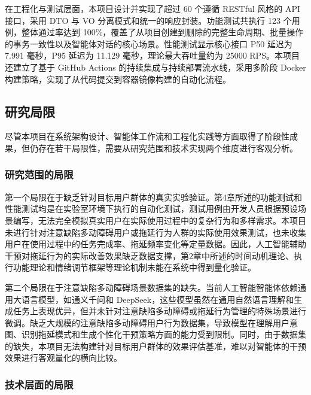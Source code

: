 \par 在工程化与测试层面，本项目设计并实现了超过 60 个遵循 RESTful 风格的 API 接口，采用 DTO 与 VO 分离模式和统一的响应封装。功能测试共执行 123 个用例，整体通过率达到 100\%，覆盖了从项目创建到删除的完整生命周期、批量操作的事务一致性以及智能体对话的核心场景。性能测试显示核心接口 P50 延迟为 7.991 毫秒，P95 延迟为 11.129 毫秒，理论最大吞吐量约为 25000 RPS。本项目还建立了基于 GitHub Actions 的持续集成与持续部署流水线，采用多阶段 Docker 构建策略，实现了从代码提交到容器镜像构建的自动化流程。

\subsection{研究局限}

\par 尽管本项目在系统架构设计、智能体工作流和工程化实践等方面取得了阶段性成果，但仍存在若干局限性，需要从研究范围和技术实现两个维度进行客观分析。

\subsubsection{研究范围的局限}

\par 第一个局限在于缺乏针对目标用户群体的真实实验验证。第4章所述的功能测试和性能测试均是在实验室环境下执行的自动化测试，测试用例由开发人员根据预设场景编写，无法完全模拟真实用户在实际使用过程中的复杂行为和多样需求。本项目未进行针对注意缺陷多动障碍用户或拖延行为人群的实际使用效果测试，也未收集用户在使用过程中的任务完成率、拖延频率变化等定量数据。因此，人工智能辅助干预对拖延行为的实际改善效果缺乏数据支撑，第2章中所述的时间动机理论、执行功能理论和情绪调节框架等理论机制未能在系统中得到量化验证。

\par 第二个局限在于注意缺陷多动障碍场景数据集的缺失。当前人工智能智能体依赖通用大语言模型，如通义千问和 DeepSeek，这些模型虽然在通用自然语言理解和生成任务上表现优异，但并未针对注意缺陷多动障碍或拖延行为管理的特殊场景进行微调。缺乏大规模的注意缺陷多动障碍用户行为数据集，导致模型在理解用户意图、识别拖延模式和生成个性化干预策略方面的能力受到限制。同时，由于数据集的缺失，本项目无法构建针对目标用户群体的效果评估基准，难以对智能体的干预效果进行客观量化的横向比较。

\subsubsection{技术层面的局限}

